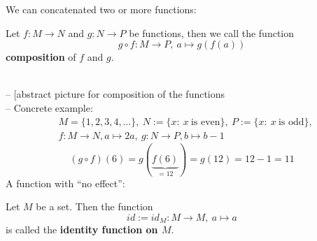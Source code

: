 \begin{frame}
\vspace{0.3cm}
We can concatenated two or more functions:\vspace{-0.3cm}
\begin{defi} \label{def:composition}
	Let $f\colon M\to N$ and $g\colon N\to P$ be functions, then we call the function
	$$g\circ f\colon M\to P,~ a \mapsto g(f(a))$$
	\textbf{composition} of $f$ and $g$. 
\end{defi}
%
{	\blank
	~\\
-- {\small\color{header}[abstract picture for composition of the functions}\\
	-- Concrete example:
	\begin{align*}
	&M=\{1,2,3,4,\dots\},~N:=\{x:~x~\text{is even}\},~P:=\{x:~x~\text{is odd}\},\\
	&f:M\rightarrow N, a\mapsto 2a,~g:N\rightarrow P, b\mapsto b-1
	\end{align*}
	$$
	(g\circ f)(6)=g(\underbrace{f(6)}_{=12})=g(12)=12-1=11
	$$
}
\noindent A function with ``no effect'':\vspace{-0.3cm}
\begin{defi} \label{def:identity}
	Let $M$ be a set. Then the function 
	$$id := id_M \colon M \to M, ~a\mapsto a $$
	is called the \textbf{identity function on $M$}.
\end{defi}

 \end{frame}





